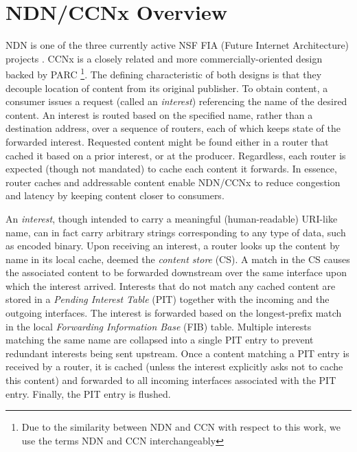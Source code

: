 \section{NDN/CCNx Overview}
NDN is one of the three currently active NSF FIA (Future Internet Architecture) projects \cite{ndn-techreport}. CCNx is a closely related and more commercially-oriented design backed by PARC \cite{ccnx}\footnote{Due to the similarity between NDN and CCN with respect to this work, we use the terms NDN and CCN interchangeably}. The defining characteristic of both designs is that they decouple location of content from its original publisher. To obtain content, a consumer issues a request (called an {\em interest}) referencing the name of the desired content. An interest is routed based on the specified name, rather than a destination address, over a sequence of routers, each of which keeps state of the forwarded interest. Requested content might be found either in a router that cached it based on a prior interest, or at the producer. Regardless, each router is expected (though not mandated) to cache each content it forwards. In essence, router caches and addressable content enable NDN/CCNx to reduce congestion and latency by keeping content closer to consumers. 

An \emph{interest}, though intended to carry a meaningful (human-readable) URI-like name, can in fact carry arbitrary strings corresponding to any type of data, such as encoded binary. Upon receiving an interest, a router looks up the content by name in its local cache, deemed the \emph{content store} (CS). A match in the CS causes the associated content to be forwarded downstream over the same interface upon which the interest arrived. Interests that do not match any cached content are stored in a \emph{Pending Interest Table} (PIT) together with the incoming and the outgoing interfaces. The interest is forwarded based on the longest-prefix match in the local \emph{Forwarding Information Base} (FIB) table. Multiple interests matching the same name are collapsed into a single PIT entry to prevent redundant interests being sent upstream. Once a content matching a PIT entry is received by a router, it is cached (unless the interest explicitly asks not to cache this content) and forwarded to all incoming interfaces associated with the PIT entry. Finally, the PIT entry is flushed.

